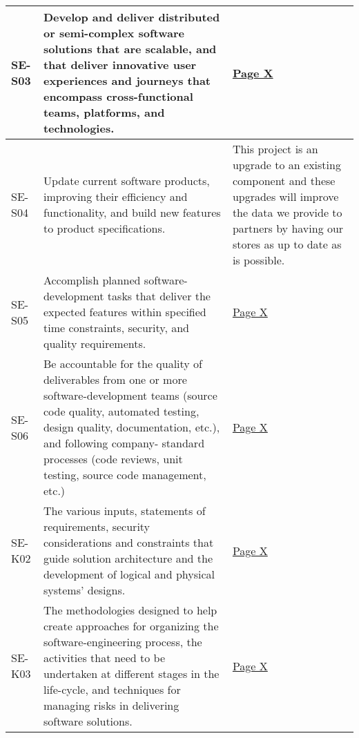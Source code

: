 \begin{longtable}{|p{2.5cm}|p{10cm}|p{1.5cm}|}
      SE-S03              & Develop and deliver distributed or semi-complex software solutions
                            that are scalable, and that deliver innovative user experiences and
                            journeys that encompass cross-functional teams, platforms, and technologies. & \hyperref[sec:cicd]{Page X} \\ \hline

      SE-S04              & Update current software products, improving their efficiency and
                            functionality, and build new features to product specifications. 
                          
                          & This project is an upgrade to an existing component and these upgrades will improve the data we provide to partners 
                          by having our stores as up to date as is possible.  \\ \hline

      SE-S05              & Accomplish planned software-development tasks that deliver the expected
                            features within specified time constraints, security, and quality requirements. & \hyperref[sec:cicd]{Page X} \\ \hline

      SE-S06              & Be accountable for the quality of deliverables from one or more
                            software-development teams (source code quality, automated testing,
                            design quality, documentation, etc.), and following company-
                            standard processes (code reviews, unit testing, source code management, etc.)  & \hyperref[sec:cicd]{Page X} \\ \hline

      SE-K02              & The various inputs, statements of requirements, security considerations
                            and constraints that guide solution architecture and the development
                            of logical and physical systems' designs. & \hyperref[sec:cicd]{Page X} \\ \hline

      SE-K03              & The methodologies designed to help create approaches for organizing
                            the software-engineering process, the activities that need to be
                            undertaken at different stages in the life-cycle, and techniques for
                            managing risks in delivering software solutions. & \hyperref[sec:cicd]{Page X} \\ \hline


\end{longtable}
